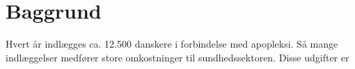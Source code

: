 \chapter{Baggrund} \label{chap:Baggrund}

Hvert år indlægges ca. 12.500 danskere i forbindelse med apopleksi. Så mange indlæggelser medfører store omkostninger til sundhedssektoren. Disse udgifter er 

